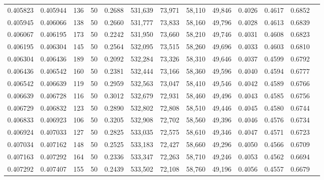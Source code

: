 \begin{tabular}{rrrrrrrrrrrrr}
0.405823 & 0.405944 &   136 &  50 &                                     0.2688 & 531,639 &  73,971 &  58,110 &  49,846 & 0.4026 & 0.4617 & 0.6852 \\
0.405945 & 0.406066 &   138 &  50 &                                     0.2660 & 531,777 &  73,833 &  58,160 &  49,796 & 0.4028 & 0.4613 & 0.6839 \\
0.406067 & 0.406195 &   173 &  50 &                                     0.2242 & 531,950 &  73,660 &  58,210 &  49,746 & 0.4031 & 0.4608 & 0.6823 \\
0.406195 & 0.406304 &   145 &  50 &                                     0.2564 & 532,095 &  73,515 &  58,260 &  49,696 & 0.4033 & 0.4603 & 0.6810 \\
0.406304 & 0.406436 &   189 &  50 &                                     0.2092 & 532,284 &  73,326 &  58,310 &  49,646 & 0.4037 & 0.4599 & 0.6792 \\
0.406436 & 0.406542 &   160 &  50 &                                     0.2381 & 532,444 &  73,166 &  58,360 &  49,596 & 0.4040 & 0.4594 & 0.6777 \\
0.406542 & 0.406639 &   119 &  50 &                                     0.2959 & 532,563 &  73,047 &  58,410 &  49,546 & 0.4042 & 0.4589 & 0.6766 \\
0.406639 & 0.406728 &   116 &  50 &                                     0.3012 & 532,679 &  72,931 &  58,460 &  49,496 & 0.4043 & 0.4585 & 0.6756 \\
0.406729 & 0.406832 &   123 &  50 &                                     0.2890 & 532,802 &  72,808 &  58,510 &  49,446 & 0.4045 & 0.4580 & 0.6744 \\
0.406833 & 0.406923 &   106 &  50 &                                     0.3205 & 532,908 &  72,702 &  58,560 &  49,396 & 0.4046 & 0.4576 & 0.6734 \\
0.406924 & 0.407033 &   127 &  50 &                                     0.2825 & 533,035 &  72,575 &  58,610 &  49,346 & 0.4047 & 0.4571 & 0.6723 \\
0.407034 & 0.407162 &   148 &  50 &                                     0.2525 & 533,183 &  72,427 &  58,660 &  49,296 & 0.4050 & 0.4566 & 0.6709 \\
0.407163 & 0.407292 &   164 &  50 &                                     0.2336 & 533,347 &  72,263 &  58,710 &  49,246 & 0.4053 & 0.4562 & 0.6694 \\
0.407292 & 0.407407 &   155 &  50 &                                     0.2439 & 533,502 &  72,108 &  58,760 &  49,196 & 0.4056 & 0.4557 & 0.6679 \\

\end{tabular}
